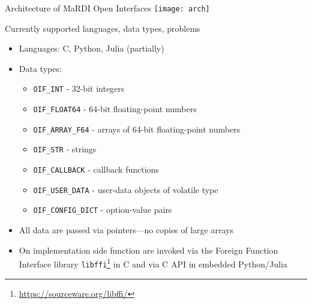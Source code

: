 \documentclass[10pt, aspectratio=169, progressbar=frametitle]{beamer}
\begin{document}
\begin{frame}{Architecture of MaRDI Open Interfaces}
  \centering
  \texttt{[image: arch]}
\end{frame}

\begin{frame}{Currently supported languages, data types, problems}
  \begin{itemize}
    \item Languages: C, Python, Julia (partially)
    \item Data types:
          \begin{itemize}
            \item \texttt{OIF\_INT} - 32-bit integers
            \item \texttt{OIF\_FLOAT64} - 64-bit floating-point numbers
            \item \texttt{OIF\_ARRAY\_F64} - arrays of 64-bit floating-point numbers
            \item \texttt{OIF\_STR} - strings
            \item \texttt{OIF\_CALLBACK} - callback functions
            \item \texttt{OIF\_USER\_DATA} - user-data objects of volatile type
            \item \texttt{OIF\_CONFIG\_DICT} - option-value pairs
          \end{itemize}
    \item All data are passed via pointers---no copies of large arrays
    \item On implementation side function are invoked via
          the Foreign Function Interface library \texttt{libffi}\footnote{\url{https://sourceware.org/libffi/}}
          in C and via C API in embedded Python/Julia
  \end{itemize}

\end{frame}
\end{document}
